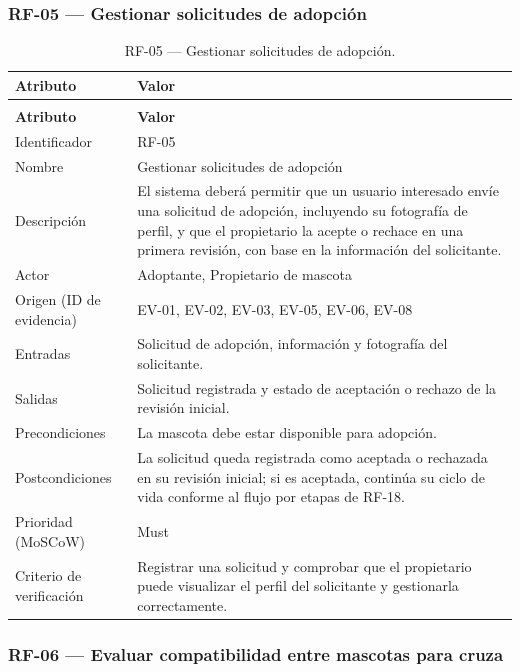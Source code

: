 \documentclass[journal,onecolumn]{IEEEtran}
\makeatletter
\newenvironment{atributos}[2]{%
	\small
	\begin{longtable}{@{}>{\raggedright\arraybackslash}p{4.2cm} >{\raggedright\arraybackslash}p{11.2cm}@{}}
		\caption{#2}\label{tab:#1}\\
		\toprule
		\textbf{Atributo} & \textbf{Valor} \\
		\midrule
		\endfirsthead
		\multicolumn{2}{@{}l}{\small\itshape (continuación)}\\
		\toprule
		\textbf{Atributo} & \textbf{Valor} \\
		\midrule
		\endhead
		\bottomrule
		\endlastfoot
	}{%
	\end{longtable}
	\normalsize
}
\makeatother
\begin{document}
	\subsubsection{RF-05 --- Gestionar solicitudes de adopción}
	
	\begin{atributos}{RF-05}{RF-05 --- Gestionar solicitudes de adopción.}
		Identificador & RF-05 \\
		Nombre & Gestionar solicitudes de adopción \\
		Descripción & El sistema deberá permitir que un usuario interesado envíe una solicitud de adopción, incluyendo su fotografía de perfil, y que el propietario la acepte o rechace en una primera revisión, con base en la información del solicitante. \\
		Actor & Adoptante, Propietario de mascota \\
		Origen (ID de evidencia) & EV-01, EV-02, EV-03, EV-05, EV-06, EV-08 \\
		Entradas & Solicitud de adopción, información y fotografía del solicitante. \\
		Salidas & Solicitud registrada y estado de aceptación o rechazo de la revisión inicial. \\
		Precondiciones & La mascota debe estar disponible para adopción. \\
		Postcondiciones & La solicitud queda registrada como aceptada o rechazada en su revisión inicial; si es aceptada, continúa su ciclo de vida conforme al flujo por etapas de RF-18. \\
		Prioridad (MoSCoW) & Must \\
		Criterio de verificación & Registrar una solicitud y comprobar que el propietario puede visualizar el perfil del solicitante y gestionarla correctamente. \\
	\end{atributos}
	
	\subsubsection{RF-06 --- Evaluar compatibilidad entre mascotas para cruza}
	
\end{document}
